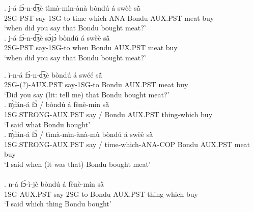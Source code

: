 \documentclass{assets/fieldnotes}
\begin{document}
\exg. j-á fɔ̀-n-d͡ʒè tìmà-mìn-ànà bòndú á swèè sã̀ \\
2SG-PST say-1SG-to time-which-ANA Bondu AUX.PST meat buy\\
`when did you say that Bondu bought meat?' \\

\exg. j-á fɔ̀-n-d͡ʒè sɔ̀jɔ̀ bòndú á swèè sã̀ \\
2SG-PST say-1SG-to when Bondu AUX.PST meat buy\\
`when did you say that Bondu bought meat?' \\



\exg. ì-n-á fɔ̀-n-d͡ʒè bòndú á swéé sã́ \\
2SG-(?)-AUX.PST say-1SG-to Bondu AUX.PST meat buy\\
`Did you say (lit: tell me) that Bondu bought meat?' \\

\exg. ɱ̀fán-á fɔ̀ / bòndú á fènè-mín sã̀ \\
1SG.STRONG-AUX.PST  say / Bondu AUX.PST thing-which buy\\
`I said what Bondu bought' \\

\exg. ɱ̀fán-á fɔ̀ / tìmà-mìn-ànà-mù bòndú á swèè sã̀ \\
1SG.STRONG-AUX.PST say / time-which-ANA-COP Bondu AUX.PST meat buy\\
`I said when (it was that) Bondu bought meat' \\

\\

\exg. n-á fɔ̀-ì-jè bòndú á fènè-mín sã̀ \\
1SG-AUX.PST say-2SG-to Bondu AUX.PST thing-which buy\\
`I said which thing Bondu bought' \\
\end{document}
